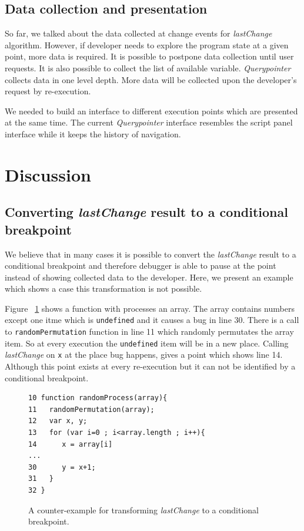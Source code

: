 \documentclass[preprint]{sigplanconf}
\begin{document}
\subsection{Data collection and presentation}
So far, we talked about the data collected at change events for \textit{lastChange} algorithm. However, if developer needs to explore the program state at a given point, more data is required. It is possible to postpone data collection until user requests. It is also possible to collect the list of available variable. \textit{Querypointer} collects data in one level depth. More data will be collected upon the developer's request by re-execution.

We needed to build an interface to different execution points which are presented at the same time. The current \textit{Querypointer} interface resembles the script panel interface while it keeps the history of navigation.

\section{Discussion}
\subsection{Converting \textit{lastChange} result to a conditional breakpoint}
We believe that in many cases it is possible to convert the \textit{lastChange} result to a conditional breakpoint and therefore debugger is able to pause at the point
 instead of showing collected data to the developer. Here, we present an example which shows a case this transformation is not possible.

Figure ~\ref{fig:counter-example} shows a function with processes an array. The array contains numbers except one itme which is \texttt{undefined} and it causes a bug in line 30. There is a call to \texttt{randomPermutation} function in line 11 which randomly permutates the array item. So at every execution the \texttt{undefined} item will be in a new place. Calling \textit{lastChange} on \texttt{x} at the place bug happens, gives a point which shows line 14. Although this point exists at every re-execution but it can not be identified by a conditional breakpoint. 

\begin{figure}[htp]
\begin{verbatim}
10 function randomProcess(array){
11   randomPermutation(array);
12   var x, y;
13   for (var i=0 ; i<array.length ; i++){
14      x = array[i]
...
30      y = x+1;
31   }
32 }
\end{verbatim}
\caption{A counter-example for transforming \textit{lastChange} to a conditional breakpoint.}
\label{fig:counter-example}
\end{figure}
 
\end{document}

